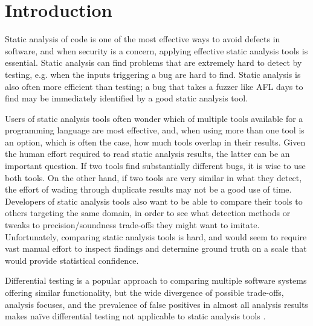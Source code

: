 \section{Introduction}

Static analysis of code is one of the most effective ways to avoid defects in software, and when security is a concern, applying effective static analysis tools is essential.  Static analysis can find problems that are extremely hard to detect by testing, e.g. when the inputs triggering a bug are hard to find.  Static analysis is also often more efficient than testing; a bug that takes a fuzzer like AFL days to find may be immediately identified by a good static analysis tool.

Users of static analysis tools often wonder which of multiple tools available for a programming language are most effective, and, when using more than one tool is an option, which is often the case, how much tools overlap in their results.  Given the human effort required to read static analysis results, the latter can be an important question.  If two tools find substantially different bugs, it is wise to use both tools.  On the other hand, if two tools are very similar in what they detect, the effort of wading through duplicate results may not be a good use of time.  Developers of static analysis tools also want to be able to compare their tools to others targeting the same domain, in order to see what detection methods or tweaks to precision/soundness trade-offs they might want to imitate.  Unfortunately, comparing static analysis tools is hard, and would seem to require vast manual effort to inspect findings and determine ground truth on a scale that would provide statistical confidence.

Differential testing \cite{Differential,ICSEDiff} is a popular approach to comparing multiple software systems offering similar functionality, but the wide divergence of possible trade-offs, analysis focuses, and the prevalence of false positives in almost all analysis results makes na\"ive differential testing not applicable to static analysis tools \cite{regehrRandom}.

